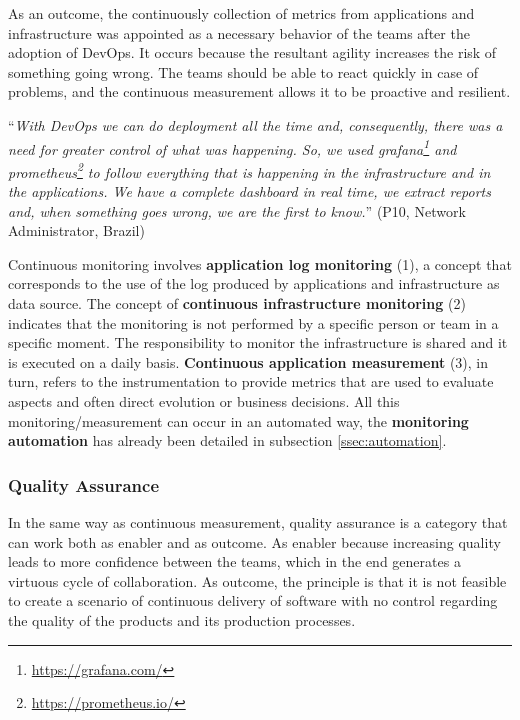 As an outcome, the continuously collection of metrics from applications and
infrastructure was appointed as a necessary behavior of the teams after the adoption
of DevOps. It occurs because the resultant agility increases the risk of
something going wrong. The teams should be able to react quickly in case of
problems, and the continuous measurement allows it to be proactive and resilient.

\begin{mq}
``\emph{With DevOps we can do deployment all the time and, consequently, there was
a need for greater control of what was happening. So, we used
grafana\footnote{\url{https://grafana.com/}} and
prometheus\footnote{\url{https://prometheus.io/}} to follow everything that is
happening in the infrastructure and in the applications. We have a complete
dashboard in real time, we extract reports and, when something goes wrong, we
are the first to know.}'' (P10, Network Administrator, Brazil)
\end{mq}

Continuous monitoring involves \textbf{application log monitoring} (1), a
concept that corresponds to the use of the log produced by
applications and infrastructure as data source. The concept of
\textbf{continuous infrastructure monitoring} (2) indicates that the monitoring
is not performed by a specific person or team in a specific moment. The
responsibility to monitor the infrastructure is shared and it is executed on
a daily basis. \textbf{Continuous application measurement} (3), in turn, refers to
the instrumentation to provide metrics that are used to evaluate aspects and
often direct evolution or business decisions. All this monitoring/measurement
can occur in an automated way, the \textbf{monitoring automation} has already been
detailed in subsection \ref{ssec:automation}.

\subsubsection{Quality Assurance}

In the same way as continuous measurement, quality assurance is a category that
can work both as enabler and as outcome. As enabler because increasing quality
leads to more confidence between the teams, which in the end generates a virtuous
cycle of collaboration. As outcome, the principle is that it is not
feasible to create a scenario of continuous delivery of software with no control
regarding the quality of the products and its production processes.

